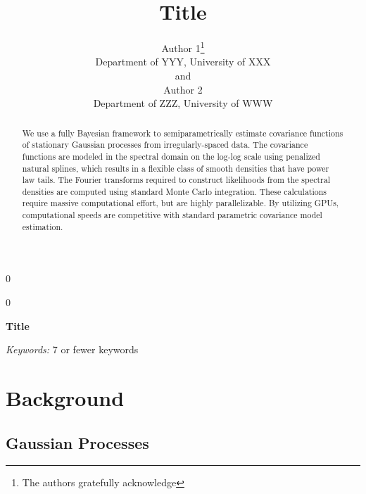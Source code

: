 \documentclass[12pt]{article}
\newcommand{\blind}{0}
\begin{document}


\def\spacingset#1{\renewcommand{\baselinestretch}%
{#1}\small\normalsize} \spacingset{1}



\blind
{
  \title{\bf Title}
  \author{Author 1\thanks{
    The authors gratefully acknowledge}\hspace{.2cm}\\
    Department of YYY, University of XXX\\
    and \\
    Author 2 \\
    Department of ZZZ, University of WWW}
  \maketitle
} \fi

\blind
{
  \bigskip
  \bigskip
  \bigskip
  \begin{center}
    {\LARGE\bf Title}
\end{center}
  \medskip
} \fi

\bigskip
\begin{abstract}
We use a fully Bayesian framework to semiparametrically estimate covariance functions of stationary Gaussian processes from irregularly-spaced data. The covariance functions are modeled in the spectral domain on the log-log scale using penalized natural splines, which results in a flexible class of smooth densities that have power law tails. The Fourier transforms required to construct likelihoods from the spectral densities are computed using standard Monte Carlo integration. These calculations require massive computational effort, but are highly parallelizable. By utilizing GPUs, computational speeds are competitive with standard parametric covariance model estimation.
\end{abstract}

\noindent%
{\it Keywords:}  7 or fewer keywords

\spacingset{1.45}
\section{Background} \label{section1:Background}

\subsection{\sloppy Gaussian Processes}
\end{document}
